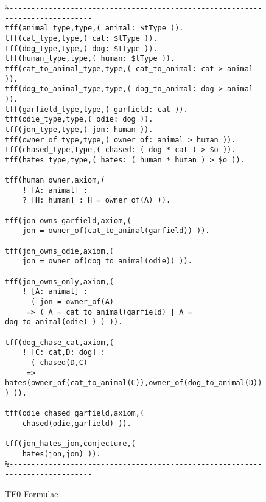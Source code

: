 \documentclass{easychair}
\begin{document}
\begin{figure}[htbp]
\begin{small}
\begin{verbatim}
%------------------------------------------------------------------------------
tff(animal_type,type,( animal: $tType )).
tff(cat_type,type,( cat: $tType )).
tff(dog_type,type,( dog: $tType )).
tff(human_type,type,( human: $tType )).
tff(cat_to_animal_type,type,( cat_to_animal: cat > animal )).
tff(dog_to_animal_type,type,( dog_to_animal: dog > animal )).
tff(garfield_type,type,( garfield: cat )).
tff(odie_type,type,( odie: dog )).
tff(jon_type,type,( jon: human )).
tff(owner_of_type,type,( owner_of: animal > human )).
tff(chased_type,type,( chased: ( dog * cat ) > $o )).
tff(hates_type,type,( hates: ( human * human ) > $o )).

tff(human_owner,axiom,(
    ! [A: animal] :
    ? [H: human] : H = owner_of(A) )).

tff(jon_owns_garfield,axiom,(
    jon = owner_of(cat_to_animal(garfield)) )).

tff(jon_owns_odie,axiom,(
    jon = owner_of(dog_to_animal(odie)) )).

tff(jon_owns_only,axiom,(
    ! [A: animal] :
      ( jon = owner_of(A)
     => ( A = cat_to_animal(garfield) | A = dog_to_animal(odie) ) ) )).

tff(dog_chase_cat,axiom,(
    ! [C: cat,D: dog] :
      ( chased(D,C)
     => hates(owner_of(cat_to_animal(C)),owner_of(dog_to_animal(D))) ) )).

tff(odie_chased_garfield,axiom,(
    chased(odie,garfield) )).

tff(jon_hates_jon,conjecture,(
    hates(jon,jon) )).
%------------------------------------------------------------------------------
\end{verbatim}
\end{small}
\caption{TF0 Formulae}
\label{TF0Example}
\end{figure}
\end{document}
